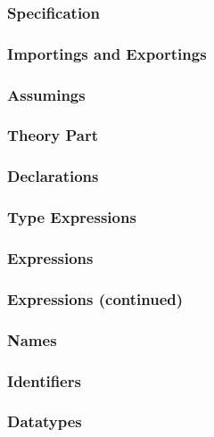 \subsubsection*{Specification}
\par\noindent
{}

\subsubsection*{Importings and Exportings}
\par\noindent
{}

\subsubsection*{Assumings}
\par\noindent
{}

\subsubsection*{Theory Part}
\par\noindent
{}

\subsubsection*{Declarations}
\par\noindent
{}

\subsubsection*{Type Expressions}
\par\noindent
{}

\subsubsection*{Expressions}
\par\noindent
{}

\subsubsection*{Expressions (continued)}
\par\noindent
{}

\subsubsection*{Names}
\par\noindent
{}

\subsubsection*{Identifiers}
\par\noindent
{}

\subsubsection*{Datatypes}
\par\noindent
{}

